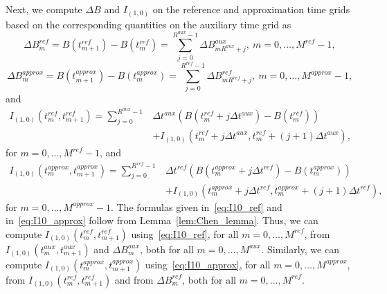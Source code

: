 \documentclass[11pt]{amsart}
\begin{document}
{Next, we compute $\Delta B$ and $I_{(1,0)}$ on the reference and approximation time grids based on the corresponding quantities on the auxiliary time grid as
\begin{equation*}
\Delta B^{ref}_{m} = B(t_{m+1}^{ref}) - B(t_{m}^{ref}) = \sum_{j=0}^{R^{aux}-1} \Delta B^{aux}_{m R^{aux}+j},\ m=0,\ldots,M^{ref}-1,
\end{equation*}
\begin{equation*}
\Delta B^{approx}_{m} = B(t_{m+1}^{approx}) - B(t_{m}^{approx}) = \sum_{j=0}^{R^{ref}-1} \Delta B^{ref}_{m R^{ref}+j},\ m=0,\ldots,M^{approx}-1,
\end{equation*}
and
\begin{equation}\label{eq:I10_ref}
  \begin{split}
    I_{(1,0)}(t_{m}^{ref},t_{m+1}^{ref}) = \sum_{j=0}^{R^{aux}-1} &\Delta t^{aux} ( B(t_{m}^{ref} + j \Delta t^{aux})-B(t_{m}^{ref})) \\ &+ I_{(1,0)}(t_{m}^{ref} + j \Delta t^{aux},t_{m}^{ref} + (j+1) \Delta t^{aux}),
  \end{split}
\end{equation}
for $m=0,\ldots,M^{ref}-1$, and
\begin{equation}\label{eq:I10_approx}
  \begin{split}
    I_{(1,0)}(t_{m}^{approx},t_{m+1}^{approx}) = \sum_{j=0}^{R^{ref}-1} &\Delta t^{ref} ( B(t_{m}^{approx} + j \Delta t^{ref})-B(t_{m}^{approx})) \\ &+ I_{(1,0)}(t_{m}^{approx} + j \Delta t^{ref},t_{m}^{approx} + (j+1) \Delta t^{ref}),
  \end{split}
\end{equation}
for $m=0,\ldots,M^{approx}-1$. The formulas given in~\eqref{eq:I10_ref} and in~\eqref{eq:I10_approx} follow from Lemma~\ref{lem:Chen_lemma}. Thus, we can compute $I_{(1,0)}(t_{m}^{ref},t_{m+1}^{ref})$ using~\eqref{eq:I10_ref}, for all $m=0,\ldots,M^{ref}$, from $I_{(1,0)}(t_{m}^{aux},t_{m+1}^{aux})$ and $\Delta B_{m}^{aux}$, both for all $m=0,\ldots,M^{aux}$. Similarly, we can compute $I_{(1,0)}(t_{m}^{approx},t_{m+1}^{approx})$ using~\eqref{eq:I10_approx}, for all $m=0,\ldots,M^{approx}$, from $I_{(1,0)}(t_{m}^{ref},t_{m+1}^{ref})$ and from $\Delta B_{m}^{ref}$, both for all $m=0,\ldots,M^{ref}$.

}
\end{document}
